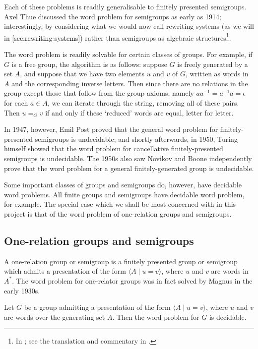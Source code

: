\documentclass[noindex,noinsetproof,emphthm,12pt]{lmaths}
\begin{document}
Each of these problems is readily generalisable to finitely presented semigroups. Axel Thue discussed the word problem for semigroups as early as 1914; interestingly, by considering what we would now call rewriting systems (as we will in \cref{sec:rewriting-systems}) rather than semigroups as algebraic structures\footnote{In \cite{Thue1914}; see the translation and commentary in \cite{Power2013}.}.

The word problem is readily solvable for certain classes of groups. For example, if $G$ is a free group, the algorithm is as follows: suppose $G$ is freely generated by a set $A$, and suppose that we have two elements $u$ and $v$ of $G$, written as words in $A$ and the corresponding inverse letters. Then since there are no relations in the group except those that follow from the group axioms, namely $aa^{-1} = a^{-1}a = \epsilon$ for each $a \in A$, we can iterate through the string, removing all of these pairs. Then $u =_G v$ if and only if these `reduced' words are equal, letter for letter.

In 1947, however, Emil Post proved \cite{Post1947} that the general word problem for finitely-presented semigroups is undecidable; and shortly afterwards, in 1950, Turing himself showed \cite{Turing1950} that the word problem for cancellative finitely-presented semigroups is undecidable. The 1950s also saw Novikov \cite{Novikov1955} and Boone \cite{Boone1959} independently prove that the word problem for a general finitely-generated group is undecidable.

Some important classes of groups and semigroups do, however, have decidable word problems. All finite groups and semigroups have decidable word problem, for example. The special case which we shall be most concerned with in this project is that of the word problem of one-relation groups and semigroups.

\subsection{One-relation groups and semigroups} \label{sec:one-relation-overview}

A one-relation group or semigroup is a finitely presented group or semigroup which admits a presentation of the form $\langle A \mid u = v\rangle$, where $u$ and $v$ are words in $A^*$. The word problem for one-relator groups was in fact solved by Magnus in the early 1930s.

\begin{theorem} \label{thm:orgp-decidablewp}
	Let $G$ be a group admitting a presentation of the form $\langle A \mid u = v\rangle$, where $u$ and $v$ are words over the generating set $A$. Then the word problem for $G$ is decidable.
\end{theorem}
\end{document}
